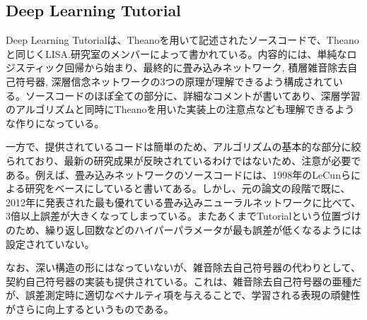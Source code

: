 \subsection{Deep Learning Tutorial}
Deep Learning Tutorialは、Theanoを用いて記述されたソースコードで、Theanoと同じくLISA.研究室のメンバーによって書かれている。内容的には、単純なロジスティック回帰から始まり、最終的に畳み込みネットワーク, 積層雑音除去自己符号器, 深層信念ネットワークの3つの原理が理解できるよう構成されている。ソースコードのほぽ全ての部分に、詳細なコメントが書いてあり、深層学習のアルゴリズムと同時にTheanoを用いた実装上の注意点なども理解できるような作りになっている。\par
一方で、提供されているコードは簡単のため、アルゴリズムの基本的な部分に絞られており、最新の研究成果が反映されているわけではないため、注意が必要である。例えば、畳み込みネットワークのソースコードには、1998年のLeCunらによる研究\cite{lecun1998gradient-based}をベースにしていると書いてある。しかし、元の論文の段階で既に、2012年に発表された最も優れている畳み込みニューラルネットワーク\cite{ciresan2012multi-column}に比べて、3倍以上誤差が大きくなってしまっている。またあくまでTutorialという位置づけのため、繰り返し回数などのハイパーパラメータが最も誤差が低くなるようには設定されていない。\par
なお、深い構造の形にはなっていないが、雑音除去自己符号器の代わりとして、契約自己符号器\cite{rifai2011contractive}\cite{rifai2011learning}の実装も提供されている。これは、雑音除去自己符号器の亜種だが、誤差測定時に適切なベナルティ項を与えることで、学習される表現の頑健性がさらに向上するというものである。

